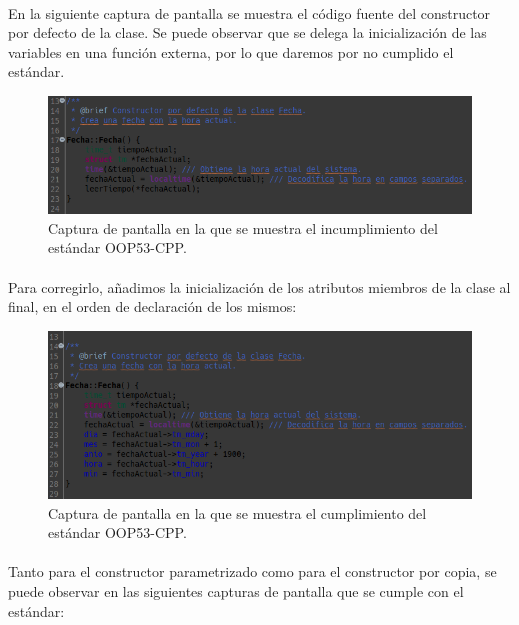 			\paragraph{}En la siguiente captura de pantalla se muestra el código fuente del constructor por defecto de la clase. Se puede observar que se delega la inicialización de las variables en una función externa, por lo que daremos por no cumplido el estándar.
			
			\begin{figure}[H]
				\centering
				\includegraphics[scale=0.6]{img/captura8.png}
				\caption{Captura de pantalla en la que se muestra el incumplimiento del estándar OOP53-CPP.}
				\label{captura8}
			\end{figure}
		
			\paragraph{}Para corregirlo, añadimos la inicialización de los atributos miembros de la clase al final, en el orden de declaración de los mismos:
			
			\begin{figure}[H]
				\centering
				\includegraphics[scale=0.6]{img/captura9.png}
				\caption{Captura de pantalla en la que se muestra el cumplimiento del estándar OOP53-CPP.}
				\label{captura9}
			\end{figure}
		
			\paragraph{}Tanto para el constructor parametrizado como para el constructor por copia, se puede observar en las siguientes capturas de pantalla que se cumple con el estándar:
			
